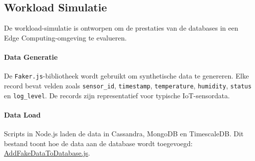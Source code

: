 \subsection{Workload Simulatie}
De workload-simulatie is ontworpen om de prestaties van de databases in een Edge Computing-omgeving te evalueren.

\paragraph{Data Generatie}
De \texttt{Faker.js}-bibliotheek wordt gebruikt om synthetische data te genereren. Elke record bevat velden zoals \texttt{sensor\_id}, \texttt{timestamp}, \texttt{temperature}, \texttt{humidity}, \texttt{status} en \texttt{log\_level}. De records zijn representatief voor typische IoT-sensordata.

\paragraph{Data Load}
Scripts in Node.js laden de data in Cassandra, MongoDB en TimescaleDB. Dit bestand toont hoe de data aan de database wordt toegevoegd: \href{https://github.com/WoutVC/bachelorproef2024/blob/main/proof_of_concept/AddFakeDataToDatabase.js}{AddFakeDataToDatabase.js}.

